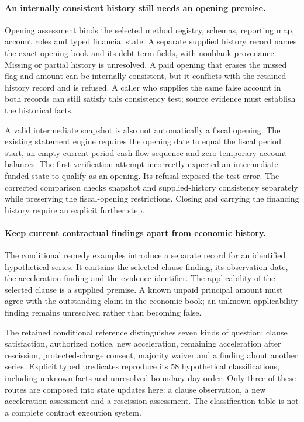 \paragraph{An internally consistent history still needs an opening premise.}
Opening assessment binds the selected method registry, schemas, reporting map,
account roles and typed financial state. A separate supplied history record
names the exact opening book and its debt-term fields, with nonblank provenance.
Missing or partial history is unresolved. A paid opening that erases the missed
flag and amount can be internally consistent, but it conflicts with the retained
history record and is refused. A caller who supplies the same false account
in both records can still satisfy this consistency test; source evidence must
establish the historical facts.

A valid intermediate snapshot is also not automatically a fiscal opening.
The existing statement engine requires the opening date to equal the fiscal
period start, an empty current-period cash-flow sequence and zero temporary
account balances. The first verification attempt incorrectly expected an
intermediate funded state to qualify as an opening. Its refusal exposed the
test error. The corrected comparison checks snapshot and supplied-history
consistency separately while preserving the fiscal-opening restrictions.
Closing and carrying the financing history require an explicit further step.

\paragraph{Keep current contractual findings apart from economic history.}
The conditional remedy examples introduce a separate record for an identified
hypothetical series. It contains the selected clause finding, its observation
date, the acceleration finding and the evidence identifier. The applicability
of the selected clause is a supplied premise. A known unpaid principal amount
must agree with the outstanding claim in the economic book; an unknown
applicability finding remains unresolved rather than becoming false.

The retained conditional reference distinguishes seven kinds of question:
clause satisfaction, authorized notice, new acceleration, remaining acceleration
after rescission, protected-change consent, majority waiver and a finding about
another series. Explicit typed predicates reproduce its 58 hypothetical
classifications, including unknown facts and unresolved boundary-day order.
Only three of these routes are composed into state updates here: a clause
observation, a new acceleration assessment and a rescission assessment. The
classification table is not a complete contract execution system.

